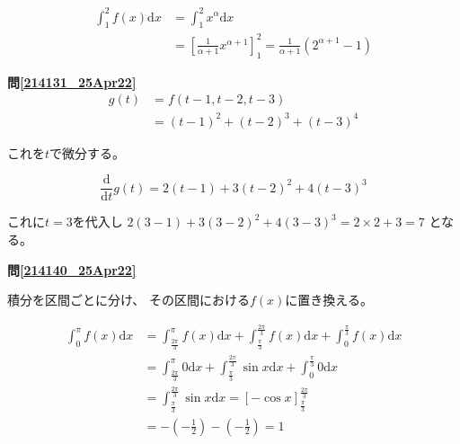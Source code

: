 \documentclass[12pt,b5paper]{ltjsarticle}
\begin{document}
\begin{align}
 \int_1^2 f(x) \mathrm{d}x
 &= \int_1^2 x^{\alpha} \mathrm{d}x\\
 &= \left[ \frac{1}{\alpha+1} x^{\alpha+1} \right]_1^2 = 
 \frac{1}{\alpha+1} (2^{\alpha+1} -1)
\end{align}


\hrulefill

\textbf{問\ref{214131_25Apr22}}
\begin{align}
 g(t) &= f(t-1,t-2,t-3)\\
 &= (t-1)^2+(t-2)^3+(t-3)^4
\end{align}

これを$t$で微分する。

\begin{equation}
 \frac{\mathrm{d}}{\mathrm{d}t}g(t) = 2(t-1) + 3(t-2)^2 + 4(t-3)^3
\end{equation}

これに$t=3$を代入し
$2(3-1) + 3(3-2)^2 + 4(3-3)^3 = 2\times 2 + 3 = 7$
となる。

\hrulefill

\textbf{問\ref{214140_25Apr22}}

積分を区間ごとに分け、
その区間における$f(x)$に置き換える。

\begin{align}
 \displaystyle \int_0^{\pi} f(x) \mathrm{d}x
  &= \int_{\frac{2\pi}{3}}^{\pi} f(x) \mathrm{d}x
  + \int_{\frac{\pi}{3}}^{\frac{2\pi}{3}} f(x) \mathrm{d}x
  + \int_0^{\frac{\pi}{3}} f(x) \mathrm{d}x\\
  &= \int_{\frac{2\pi}{3}}^{\pi} 0 \mathrm{d}x
  + \int_{\frac{\pi}{3}}^{\frac{2\pi}{3}} \sin x \mathrm{d}x
  + \int_0^{\frac{\pi}{3}} 0 \mathrm{d}x\\
  &= \int_{\frac{\pi}{3}}^{\frac{2\pi}{3}} \sin x \mathrm{d}x
 = \left[ -\cos x \right]_{\frac{\pi}{3}}^{\frac{2\pi}{3}}\\
  &= -\left( -\frac{1}{2}\right) - \left( -\frac{1}{2} \right)
 = 1
\end{align}
\end{document}
